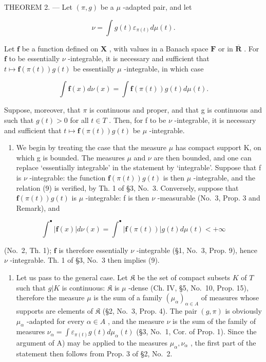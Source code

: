 THEOREM 2. --- Let \((\pi, g)\) be a \(\mu\) -adapted pair, and let

\[
\nu = \int g (t) \varepsilon_ {\pi (t)} d \mu (t).
\]

Let \(\mathbf{f}\) be a function defined on \(\mathbf{X}\) , with values in a Banach space \(\mathbf{F}\) or in \(\overline{\mathbf{R}}\) . For \(\mathbf{f}\) to be essentially \(\nu\) -integrable, it is necessary and sufficient that \(t \mapsto \mathbf{f}(\pi(t))g(t)\) be essentially \(\mu\) -integrable, in which case

\[
\int \mathbf {f} (x) d \nu (x) = \int \mathbf {f} (\pi (t)) g (t) d \mu (t).\tag{9}
\]

Suppose, moreover, that \(\pi\) is continuous and proper, and that g is continuous and such that \(g(t) > 0\) for all \(t \in T\) . Then, for f to be \(\nu\) -integrable, it is necessary and sufficient that \(t \mapsto \mathbf{f}(\pi(t))g(t)\) be \(\mu\) -integrable.

\begin{enumerate}
\def\labelenumi{\Alph{enumi})}
\tightlist
\item
  We begin by treating the case that the measure \(\mu\) has compact support K, on which g is bounded. The measures \(\mu\) and \(\nu\) are then bounded, and one can replace `essentially integrable' in the statement by `integrable'. Suppose that f is \(\nu\) -integrable: the function \(\mathbf{f}(\pi(t))g(t)\) is then \(\mu\) -integrable, and the relation (9) is verified, by Th. 1 of §3, No.~3. Conversely, suppose that \(\mathbf{f}(\pi(t))g(t)\) is \(\mu\) -integrable: f is then \(\nu\) -measurable (No.~3, Prop. 3 and Remark), and
\end{enumerate}

\[
\int^ {\bullet} | \mathbf {f} (x) | d \nu (x) = \int^ {\bullet} | \mathbf {f} (\pi (t)) | g (t) d \mu (t) <   + \infty
\]

(No.~2, Th. 1); \(\mathbf{f}\) is therefore essentially \(\nu\) -integrable (§1, No.~3, Prop. 9), hence \(\nu\) -integrable. Th. 1 of §3, No.~3 then implies (9).

\begin{enumerate}
\def\labelenumi{\Alph{enumi})}
\setcounter{enumi}{1}
\tightlist
\item
  Let us pass to the general case. Let \(\mathfrak{K}\) be the set of compact subsets \(K\) of \(T\) such that \(g|K\) is continuous: \(\mathfrak{K}\) is \(\mu\) -dense (Ch. IV, §5, No.~10, Prop. 15), therefore the measure \(\mu\) is the sum of a family \((\mu_{\alpha})_{\alpha \in A}\) of measures whose supports are elements of \(\mathfrak{K}\) (§2, No.~3, Prop. 4). The pair \((g,\pi)\) is obviously \(\mu_{\alpha}\) -adapted for every \(\alpha \in A\) , and the measure \(\nu\) is the sum of the family of measures \(\nu_{\alpha} = \int \varepsilon_{\pi(t)} g(t) d\mu_{\alpha}(t)\) (§3, No.~1, Cor. of Prop. 1). Since the argument of A) may be applied to the measures \(\mu_{\alpha}, \nu_{\alpha}\) , the first part of the statement then follows from Prop. 3 of §2, No.~2.
\end{enumerate}

